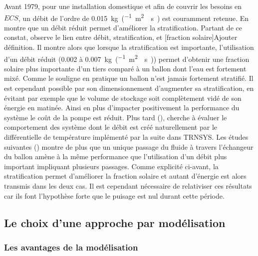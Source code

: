 Avant 1979, pour une installation domestique et afin de couvrir les besoins
en $ECS$, un débit de l’ordre de \SI{0.015}{kg\per(\metre\squared\period\second)}
est couramment retenue. En  montre que un débit réduit
permet d’améliorer la stratification. Partant de ce constat, 
observe le lien entre débit, stratification, et [fraction solaire]{Ajouter définition}.
Il montre alors que lorsque la stratification est importante, l’utilisation d’un débit
réduit (\num{0.002} à \SI{0.007}{kg\per(\metre\squared\period\second)}) permet
d’obtenir une fraction solaire plus importante d’un tiers comparé à un ballon dont
l’eau est fortement mixé. Comme le souligne  en pratique
un ballon n’est jamais fortement stratifié. Il est cependant possible par son dimensionnement
d’augmenter sa stratification, en évitant par exemple que le volume de stockage soit
complètement vidé de son énergie en matinée. Ainsi en plus d’impacter positivement
la performance du système le coût de la pompe est réduit. Plus tard (),
cherche à évaluer le comportement des système dont le débit est créé naturellement
par le différentielle de température implémenté par la suite dans TRNSYS. Les études
suivantes () montre de plus que un unique
passage du fluide à travers l’échangeur du ballon amène à la même performance que
l’utilisation d’un débit plus important impliquant plusieurs passages. Comme explicité
ci-avant, la stratification permet d’améliorer la fraction solaire et autant d’énergie est
alors transmis dans les deux cas. Il est cependant nécessaire de relativiser ces
résultats car ils font l’hypothèse forte que le puisage est nul durant cette période.






\subsection{Le choix d’une approche par modélisation} %
\label{sub:le_choix_d_une_approche_par_modelisation}
\subsubsection{Les avantages de la modélisation} %
\label{ssub:les_avantages_de_la_modelisation}
~



